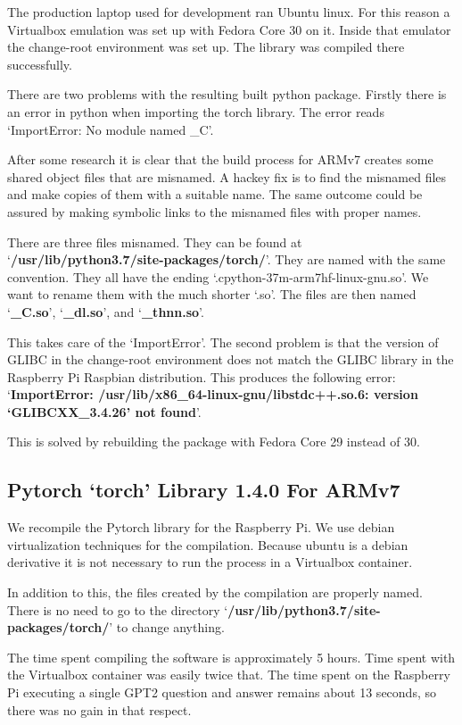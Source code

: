 The production laptop used for development ran Ubuntu linux. For this reason a Virtualbox emulation was set up with Fedora Core 30 on it. Inside that emulator the change-root environment was set up. The library was compiled there successfully. 

There are two problems with the resulting built python package. Firstly there is an error in python when importing the torch library. The error reads `ImportError: No module named \_C'. 

After some research it is clear that the build process for ARMv7 creates some shared object files that are misnamed. A hackey fix is to find the misnamed files and make copies of them with a suitable name. The same outcome could be assured by making symbolic links to the misnamed files with proper names.

There are three files misnamed. They can be found at `\textbf{/usr/lib/python3.7/site-packages/torch/}'. They are named with the same convention. They all have the ending `.cpython-37m-arm7hf-linux-gnu.so'. We want to rename them with the much shorter `.so'. The files are then named `\textbf{\_C.so}', `\textbf{\_dl.so}', and `\textbf{\_thnn.so}'.

This takes care of the `ImportError'. The second problem is that the version of GLIBC in the change-root environment does not match the GLIBC library in the Raspberry Pi Raspbian distribution. This produces the following error: `\textbf{ImportError: /usr/lib/x86\_64-linux-gnu/libstdc++.so.6: version `GLIBCXX\_3.4.26' not found}'.

This is solved by rebuilding the package with Fedora Core 29 instead of 30. 
 
\subsection*{Pytorch `torch' Library 1.4.0 For ARMv7}
We recompile the Pytorch library for the Raspberry Pi. We use debian virtualization techniques for the compilation. Because ubuntu is a debian derivative it is not necessary to run the process in a Virtualbox container. 

In addition to this, the files created by the compilation are properly named. There is no need to go to the directory `\textbf{/usr/lib/python3.7/site-packages/torch/}' to change anything. 

The time spent compiling the software is approximately 5 hours. Time spent with the Virtualbox container was easily twice that. The time spent on the Raspberry Pi executing a single GPT2 question and answer remains about 13 seconds, so there was no gain in that respect.

